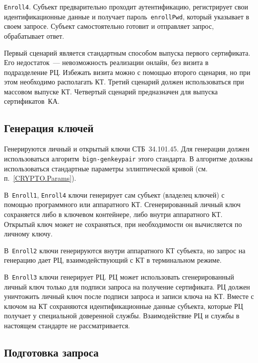 \texttt{Enroll4}.
Субъект предварительно проходит аутентификацию, регистрирует свои 
идентификационные данные и получает пароль~\texttt{enrollPwd}, 
который указывает в своем запросе. Субъект самостоятельно готовит и 
отправляет запрос, обрабатывает ответ.

Первый сценарий является стандартным способом выпуска первого сертификата. 
Его недостаток~--- невозможность реализации онлайн, 
без визита в подразделение РЦ. Избежать визита можно с помощью второго 
сценария, но при этом необходимо располагать КТ. 
%
Третий сценарий должен использоваться при массовом выпуске КТ.
%
Четвертый сценарий предназначен для выпуска сертификатов~КА.

\subsection{Генерация ключей}\label{PROCESSES.Enroll.Gen}

Генерируются личный и открытый ключи СТБ~34.101.45.
Для генерации должен использоваться алгоритм~\texttt{bign-genkeypair}
этого стандарта. В алгоритме должны использоваться 
стандартные параметры эллиптической кривой (см. п.~\ref{CRYPTO.Params}).

В~\texttt{Enroll1}, \texttt{Enroll4} ключи генерирует сам субъект 
(владелец ключей) с помощью программного или аппаратного КТ. 
Сгенерированный личный ключ сохраняется либо в ключевом контейнере, либо 
внутри аппаратного КТ. Открытый ключ может не сохраняться, при необходимости он 
вычисляется по личному ключу.


В~\texttt{Enroll2} ключи генерируются внутри аппаратного КТ субъекта,
но запрос на генерацию дает РЦ, взаимодействующий с КТ в терминальном 
режиме. 

В~\texttt{Enroll3} ключи генерирует РЦ. 
РЦ может использовать сгенерированный личный ключ только для 
подписи запроса на получение сертификата. РЦ должен уничтожить личный ключ 
после подписи запроса и записи ключа на КТ.
%
Вместе с ключом на КТ сохраняются идентификационные данные субъекта,
которые РЦ получает у специальной доверенной службы. 
Взаимодействие РЦ и службы в настоящем стандарте не рассматривается.

\subsection{Подготовка запроса}\label{PROCESSES.Enroll.CSR}

